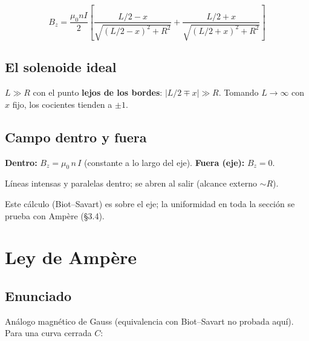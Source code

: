 \documentclass[12pt,a4paper]{article}
\begin{document}
\begin{keybox}
  \[
  \boxed{B_z = \frac{\mu_0 n I}{2}\!\left[
    \frac{L/2 - x}{\sqrt{(L/2-x)^2 + R^2}} +
    \frac{L/2 + x}{\sqrt{(L/2+x)^2 + R^2}}\right]}
  \]

\end{keybox}



\subsection{El solenoide ideal}

$L \gg R$ con el punto \textbf{lejos de los bordes}: $|L/2 \mp x| \gg R$.
Tomando $L\to\infty$ con $x$ fijo, los cocientes tienden a $\pm 1$.

\subsection{Campo dentro y fuera}

\begin{keybox}
  \textbf{Dentro:} $\boxed{B_z = \mu_0\, n\, I}$ (constante a lo largo del
  eje). \textbf{Fuera (eje):} $B_z = 0$.
\end{keybox}

Líneas intensas y paralelas dentro; se abren al salir (alcance externo
$\sim R$).

\begin{notebox}
  Este cálculo (Biot--Savart) es sobre el eje; la uniformidad en toda la
  sección se prueba con Ampère (\S3.4).

\end{notebox}



\section{Ley de Ampère}

\subsection{Enunciado}

Análogo magnético de Gauss (equivalencia con Biot--Savart no probada
aquí). Para una curva cerrada $C$:
\end{document}

